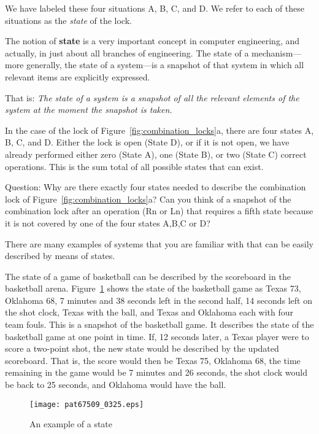 \documentclass{patt}
\begin{document}
\noindent
We have labeled these four situations A, B, C, and D.  We refer to
each of these situations as the {\em state} of the lock.

The notion of {\bf state} is a very important concept in computer
\lightbulb[-5pt]
engineering, and actually, in just about all branches of engineering.
The state of a mechanism---more generally, the state of a system---is
a snapshot of that system in which all relevant items are explicitly
expressed.


That is: {\em The state of a system is a snapshot of all the relevant
  elements of the system at the moment the snapshot is taken.}


In the case of the lock of Figure~\ref{fig:combination_locks}a, there are 
four states A, B, C, and D. Either the lock is open (State D), or if it is 
not open, we have already performed either zero (State A), one (State B), 
or two (State C) correct operations.  This is the sum total of all possible
states that can exist.  

Question: Why are there exactly four states needed to describe the combination
lock of Figure~\ref{fig:combination_locks}a?  Can you think of a snapshot of
the combination lock after an operation (Rn or Ln) that requires a fifth state
because it is not covered by one of the four states A,B,C or D?

There are many examples of systems that you are familiar with that can be 
easily described by means of states.

The state of a game of basketball can be described by the scoreboard
in the basketball arena.  Figure~\ref{fig:scoreboard} shows the state of the
basketball game as Texas 73, Oklahoma 68, 7 minutes and 38 seconds
left in the second half, 14 seconds left on the shot clock, Texas with
the ball, and Texas and Oklahoma each with four team fouls.  This is a
snapshot of the basketball game.  It describes the state of the
basketball game at one point in time.  If, 12 seconds later, a Texas player were
to score a two-point shot, the new state would be described by the
updated scoreboard.  That is, the score would then be Texas 75,
Oklahoma 68, the time remaining in the game would be 7 minutes and 26
seconds, the shot clock would be back to 25 seconds, and Oklahoma
would have the ball.

\begin{figure}[b]
\centerline{\texttt{[image: pat67509\_0325.eps]}}
\caption{An example of a state}\label{fig:scoreboard}
\end{figure}
\end{document}

